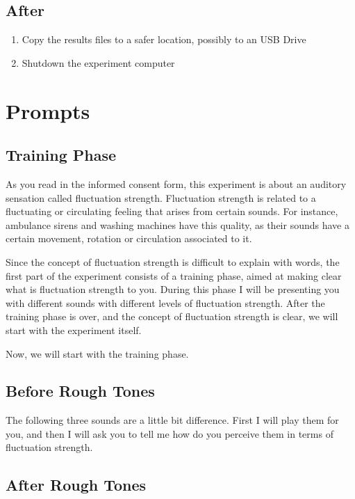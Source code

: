 \documentclass[../main.tex]{subfiles}
\begin{document}
\subsection{After}

\begin{enumerate}
  \item Copy the results files to a safer location, possibly to an USB Drive
  \item Shutdown the experiment computer
\end{enumerate}

\section{Prompts}

\subsection{Training Phase}

As you read in the informed consent form, this experiment is about an auditory
sensation called fluctuation strength. Fluctuation strength is related to a
fluctuating or circulating feeling that arises from certain sounds. For
instance, ambulance sirens and washing machines have this quality, as their
sounds have a certain movement, rotation or circulation associated to it.

Since the concept of fluctuation strength is difficult to explain with words,
the first part of the experiment consists of a training phase, aimed at making
clear what is fluctuation strength to you. During this phase I will be
presenting you with different sounds with different levels of fluctuation
strength. After the training phase is over, and the concept of fluctuation
strength is clear, we will start with the experiment itself.

Now, we will start with the training phase.

\label{sub:training_phase}

\subsection{Before Rough Tones}
\label{sub:before_rough_tones}

The following three sounds are a little bit difference. First I will play them
for you, and then I will ask you to tell me how do you perceive them in terms
of fluctuation strength.

\subsection{After Rough Tones}
\label{sub:after_rough_tones}
\end{document}
